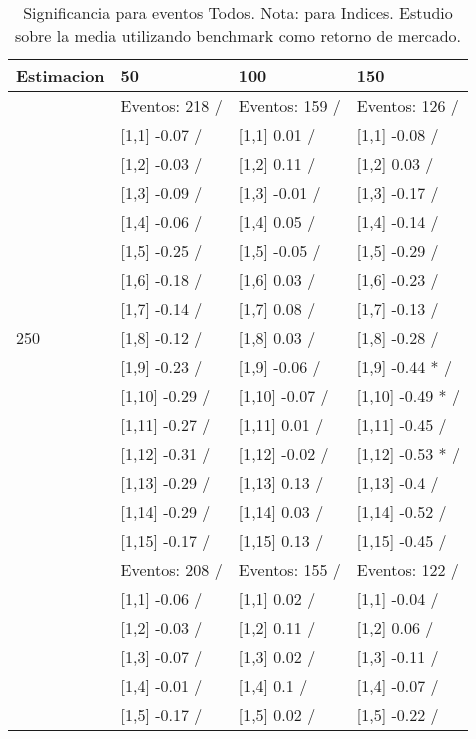 \begin{table}

\caption{Significancia para eventos Todos. Nota: para Indices. Estudio sobre la media utilizando benchmark como retorno de mercado.}
\centering
\begin{tabular}[t]{llll}
\toprule
Estimacion & 50 & 100 & 150\\
\midrule
 & Eventos:  218 / & Eventos:  159 / & Eventos:  126 /\\
 & {}[1,1] -0.07  / & {}[1,1] 0.01  / & {}[1,1] -0.08  /\\
 & {}[1,2] -0.03  / & {}[1,2] 0.11  / & {}[1,2] 0.03  /\\
 & {}[1,3] -0.09  / & {}[1,3] -0.01  / & {}[1,3] -0.17  /\\
 & {}[1,4] -0.06  / & {}[1,4] 0.05  / & {}[1,4] -0.14  /\\
\addlinespace
 & {}[1,5] -0.25  / & {}[1,5] -0.05  / & {}[1,5] -0.29  /\\
 & {}[1,6] -0.18  / & {}[1,6] 0.03  / & {}[1,6] -0.23  /\\
 & {}[1,7] -0.14  / & {}[1,7] 0.08  / & {}[1,7] -0.13  /\\
250 & {}[1,8] -0.12  / & {}[1,8] 0.03  / & {}[1,8] -0.28  /\\
 & {}[1,9] -0.23  / & {}[1,9] -0.06  / & {}[1,9] -0.44 * /\\
\addlinespace
 & {}[1,10] -0.29  / & {}[1,10] -0.07  / & {}[1,10] -0.49 * /\\
 & {}[1,11] -0.27  / & {}[1,11] 0.01  / & {}[1,11] -0.45  /\\
 & {}[1,12] -0.31  / & {}[1,12] -0.02  / & {}[1,12] -0.53 * /\\
 & {}[1,13] -0.29  / & {}[1,13] 0.13  / & {}[1,13] -0.4  /\\
 & {}[1,14] -0.29  / & {}[1,14] 0.03  / & {}[1,14] -0.52  /\\
\addlinespace
 & {}[1,15] -0.17  / & {}[1,15] 0.13  / & {}[1,15] -0.45  /\\
 & Eventos:  208 / & Eventos:  155 / & Eventos:  122 /\\
 & {}[1,1] -0.06  / & {}[1,1] 0.02  / & {}[1,1] -0.04  /\\
 & {}[1,2] -0.03  / & {}[1,2] 0.11  / & {}[1,2] 0.06  /\\
 & {}[1,3] -0.07  / & {}[1,3] 0.02  / & {}[1,3] -0.11  /\\
\addlinespace
 & {}[1,4] -0.01  / & {}[1,4] 0.1  / & {}[1,4] -0.07  /\\
 & {}[1,5] -0.17  / & {}[1,5] 0.02  / & {}[1,5] -0.22  /\\

\end{tabular}
\end{table}
